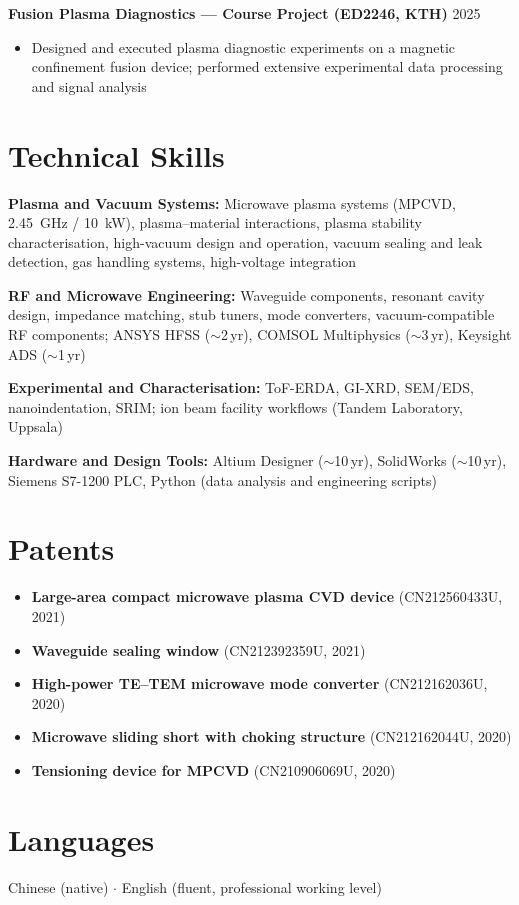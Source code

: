 \documentclass[a4paper,11pt]{article}
\begin{document}
\medskip
\noindent\textbf{Fusion Plasma Diagnostics --- Course Project (ED2246, KTH)}
\hfill 2025
\begin{itemize}[noitemsep, topsep=2pt, leftmargin=*]
    \item Designed and executed plasma diagnostic experiments on a
          magnetic confinement fusion device; performed extensive
          experimental data processing and signal analysis
\end{itemize}

\section*{Technical Skills}

\noindent\textbf{Plasma and Vacuum Systems:}
Microwave plasma systems (MPCVD, 2.45~GHz / 10~kW), plasma--material interactions,
plasma stability characterisation, high-vacuum design and operation,
vacuum sealing and leak detection, gas handling systems, high-voltage integration

\smallskip
\noindent\textbf{RF and Microwave Engineering:}
Waveguide components, resonant cavity design, impedance matching,
stub tuners, mode converters, vacuum-compatible RF components;
ANSYS HFSS ($\sim$2\,yr), COMSOL Multiphysics ($\sim$3\,yr),
Keysight ADS ($\sim$1\,yr)

\smallskip
\noindent\textbf{Experimental and Characterisation:}
ToF-ERDA, GI-XRD, SEM/EDS, nanoindentation, SRIM;
ion beam facility workflows (Tandem Laboratory, Uppsala)

\smallskip
\noindent\textbf{Hardware and Design Tools:}
Altium Designer ($\sim$10\,yr), SolidWorks ($\sim$10\,yr),
Siemens S7-1200 PLC, Python (data analysis and engineering scripts)

\section*{Patents}

\begin{itemize}[noitemsep, topsep=2pt, leftmargin=*]
    \item \textbf{Large-area compact microwave plasma CVD device}
          (CN212560433U, 2021)
    \item \textbf{Waveguide sealing window} (CN212392359U, 2021)
    \item \textbf{High-power TE--TEM microwave mode converter}
          (CN212162036U, 2020)
    \item \textbf{Microwave sliding short with choking structure}
          (CN212162044U, 2020)
    \item \textbf{Tensioning device for MPCVD} (CN210906069U, 2020)
\end{itemize}

\section*{Languages}

Chinese (native) \enspace $\cdot$ \enspace English (fluent, professional working level)
\end{document}
